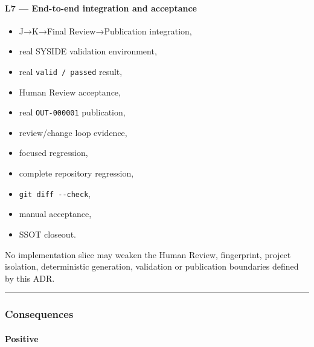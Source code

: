 \hypertarget{l7--end-to-end-integration-and-acceptance}{%
\paragraph{L7 --- End-to-end integration and acceptance}\label{l7--end-to-end-integration-and-acceptance}}

\begin{itemize}
\tightlist
\item
  J→K→Final Review→Publication integration,
\item
  real SYSIDE validation environment,
\item
  real \texttt{valid\ /\ passed} result,
\item
  Human Review acceptance,
\item
  real \texttt{OUT-000001} publication,
\item
  review/change loop evidence,
\item
  focused regression,
\item
  complete repository regression,
\item
  \texttt{git\ diff\ -\/-check},
\item
  manual acceptance,
\item
  SSOT closeout.
\end{itemize}

No implementation slice may weaken the Human Review, fingerprint, project isolation, deterministic generation, validation or publication boundaries defined by this ADR.

\begin{center}\rule{0.5\linewidth}{0.5pt}\end{center}

\hypertarget{consequences-8}{%
\subsubsection{Consequences}\label{consequences-8}}

\hypertarget{positive-2}{%
\paragraph{Positive}\label{positive-2}}


